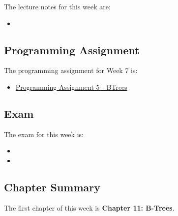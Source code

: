The lecture notes for this week are:

\begin{itemize}
    \item {}
\end{itemize}

\subsection{Programming Assignment}

The programming assignment for Week 7 is:

\begin{itemize}
    \item \href{https://github.com/QuantumCompiler/CU/tree/main/CSPB%202270%20-%20Data%20Structures/Assignments/Assignment%205%20-%20B-Trees}{Programming Assignment 5 - BTrees}
\end{itemize}

\subsection{Exam}

The exam for this week is:

\begin{itemize}
    \item {}
    \item {}
\end{itemize}

\newpage

\subsection{Chapter Summary}

The first chapter of this week is \textbf{Chapter 11: B-Trees}.

